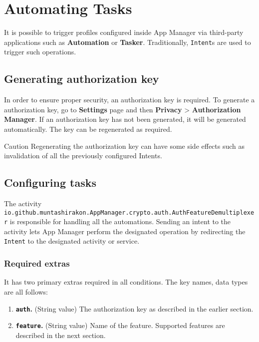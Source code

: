 \section{Automating Tasks}\label{sec:automating-tasks} %
It is possible to trigger profiles configured inside App Manager via third-party applications such as \textbf{Automation} or \textbf{Tasker}.
Traditionally, \texttt{Intent}s are used to trigger such operations.

\subsection{Generating authorization key}\label{subsec:generating-authorization-key} %
In order to ensure proper security, an authorization key is required. To generate a authorization key, go to \textbf{Settings} page and then \textbf{Privacy} > \textbf{Authorization Manager}.
If an authorization key has not been generated, it will be generated automatically. The key can be regenerated as required.

\begin{danger}{Caution}
    Regenerating the authorization key can have some side effects such as invalidation of all the previously configured Intents.
\end{danger}

\subsection{Configuring tasks}\label{subsec:at:general-configuration} %
The activity \texttt{io.github.muntashirakon.AppManager.crypto.auth.AuthFeatureDemultiplexer} is responsible for handling all the automations.
Sending an intent to the activity lets App Manager perform the designated operation by redirecting the \texttt{Intent} to the designated activity or service.

\subsubsection{Required extras} %
It has two primary extras required in all conditions. The key names, data types are all follows:
\begin{enumerate}
    \item \textbf{\texttt{auth}.} (String value) The authorization key as described in the earlier section.
    \item \textbf{\texttt{feature}.} (String value) Name of the feature. Supported features are described in the next section.
\end{enumerate}

